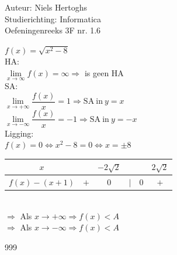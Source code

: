 \documentclass[a4paper]{article}
\begin{document}
  
\noindent \large Auteur: Niels Hertoghs\\
\noindent \large Studierichting:  Informatica\\
\noindent \large Oefeningenreeks 3F nr. 1.6\\

\medskip

\normalsize

$f(x) = \sqrt{x^2 - 8}$\\

HA:\\

$\lim\limits_{x \rightarrow \infty} f(x) = \infty \Rightarrow$ is geen HA\\

SA:\\

$\lim\limits_{x \rightarrow +\infty} \dfrac{f(x)}{x} = 1 \Rightarrow \mathrm{SA\ in\ } y = x$\\

$\lim\limits_{x \rightarrow -\infty} \dfrac{f(x)}{x} = -1 \Rightarrow \mathrm{SA\ in\ } y = -x$\\

Ligging:\\

$f(x) = 0 \Leftrightarrow x^2 - 8 = 0 \Leftrightarrow x = \pm 8$\\

\begin{tabular}{c|ccccc}
$x$ &   & $-2\sqrt{2}$ & & & $2\sqrt{2}$ \\ \hline

$f(x) - ( x + 1 )$ & $+$ & $0$ & $|$ & $0$ & $+$\\

\end{tabular}\\

$\Rightarrow $ Als $x \rightarrow +\infty \Rightarrow f(x) < A$\\

$\Rightarrow $ Als $x \rightarrow -\infty \Rightarrow f(x) < A$\\






\begin{thebibliography}{999}
\end{thebibliography}
\end{document}
